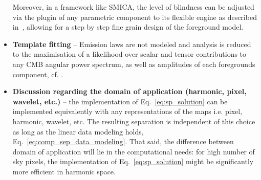 \begin{itemize}
Moreover, in a framework like SMICA, the level of blindness can be adjusted via the plugin of any parametric component to its flexible engine as described in~\cite{cardoso08}, allowing for a step by step fine grain design of the foreground model.\\
	\item \textbf{Template fitting} -- 	Emission laws are not modeled and analysis is reduced to the maximisation of a likelihood over scalar and tensor contributions to any CMB angular power spectrum, as well as amplitudes of each foregrounds component, cf. \cite{katayama11}.
	\item \textbf{Discussion regarding the domain of application (harmonic, pixel, wavelet, etc.)} -- the implementation of Eq.~\ref{eq:sp_solution} can be implemented equivalently with any representations of the maps i.e. pixel, harmonic, wavelet, etc. The resulting separation is independent of this choice as long as the linear data modeling holds, Eq.~\ref{eq:comp_sep_data_modeling}. That said, the difference between domain of application will lie in the computational needs: for high number of sky pixels, the implementation of Eq.~\ref{eq:sp_solution} might be significantly more efficient in harmonic space.
\end{itemize}


